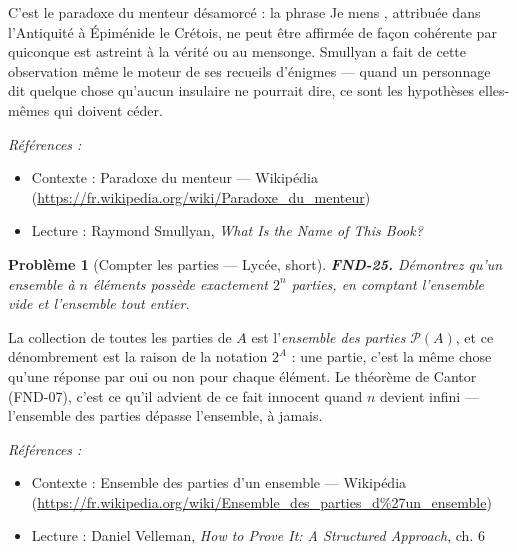 \documentclass[11pt]{article}
\newtheorem{problem}{Problème}
\newenvironment{refs}{\par\small\noindent\emph{Références :}\begin{itemize}\setlength\itemsep{0pt}}{\end{itemize}\normalsize}
\begin{document}
\noindent C'est le paradoxe du menteur désamorcé : la phrase \og{} Je mens \fg{}, attribuée dans
l'Antiquité à Épiménide le Crétois, ne peut être affirmée de façon cohérente par quiconque est
astreint à la vérité ou au mensonge. Smullyan a fait de cette observation même le moteur de ses
recueils d'énigmes --- quand un personnage dit quelque chose qu'aucun insulaire ne pourrait dire,
ce sont les hypothèses elles-mêmes qui doivent céder.

\begin{refs}
\item Contexte : Paradoxe du menteur --- Wikipédia (\url{https://fr.wikipedia.org/wiki/Paradoxe_du_menteur})
\item Lecture : Raymond Smullyan, \textit{What Is the Name of This Book?}
\end{refs}

\bigskip

\begin{problem}[{Compter les parties --- Lycée, short}]
\textbf{FND-25.} Démontrez qu'un ensemble à $ n $ éléments possède
exactement $ 2^n $ parties, en comptant l'ensemble vide et l'ensemble tout entier.
\end{problem}

\noindent La collection de toutes les parties de $ A $ est l'\textit{ensemble des parties}
$ \mathcal{P}(A) $, et ce dénombrement est la raison de la notation $ 2^A $ : une partie,
c'est la même chose qu'une réponse par oui ou non pour chaque élément. Le théorème de Cantor
(FND-07), c'est ce qu'il advient de ce fait innocent quand $ n $ devient infini --- l'ensemble
des parties dépasse l'ensemble, à jamais.

\begin{refs}
\item Contexte : Ensemble des parties d'un ensemble --- Wikipédia (\url{https://fr.wikipedia.org/wiki/Ensemble_des_parties_d%27un_ensemble})
\item Lecture : Daniel Velleman, \textit{How to Prove It: A Structured Approach}, ch. 6
\end{refs}

\bigskip
\end{document}
